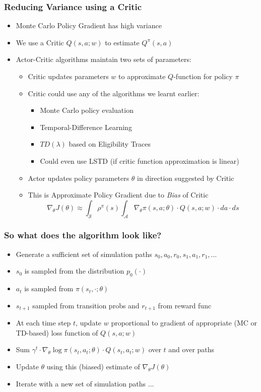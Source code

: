 \documentclass[handout]{beamer}
\begin{document}
\begin{frame}
\frametitle{Reducing Variance using a Critic}
\pause
\begin{itemize}[<+->]
\item Monte Carlo Policy Gradient has high variance
\item We use a Critic $Q(s,a; w)$ to estimate $Q^{\pi}(s,a)$
\item Actor-Critic algorithms maintain two sets of parameters:
\begin{itemize}
\item Critic updates parameters $w$ to approximate $Q$-function for policy $\pi$
\item Critic could use any of the algorithms we learnt earlier:
\begin{itemize}
\item Monte Carlo policy evaluation
\item Temporal-Difference Learning
\item $TD(\lambda)$ based on Eligibility Traces
\item Could even use LSTD (if critic function approximation is linear)
\end{itemize}
\item Actor updates policy parameters $\theta$ in direction suggested by Critic
\item This is Approximate Policy Gradient due to {\em Bias} of Critic
$$ \nabla_{\theta} J(\theta) \approx \int_{\mathcal{S}} \rho^{\pi}(s) \int_{\mathcal{A}} \nabla_{\theta} \pi(s, a; \theta) \cdot Q(s,a; w) \cdot da \cdot ds $$
\end{itemize}
\end{itemize}
\end{frame}

\begin{frame}
\frametitle{So what does the algorithm look like?}
\pause
\begin{itemize}[<+->]
\item Generate a sufficient set of simulation paths $s_0,a_0,r_0,s_1,a_1,r_1,\ldots$
\item $s_0$ is sampled from the distribution $p_0(\cdot)$
\item $a_t$ is sampled from $\pi(s_t,\cdot; \theta)$
\item $s_{t+1}$ sampled from transition probs and $r_{t+1}$ from reward func
\item At each time step $t$, update $w$ proportional to gradient of appropriate (MC or TD-based) loss function of $Q(s,a;w)$
\item Sum $\gamma^t \cdot \nabla_{\theta} \log \pi(s_t,a_t; \theta) \cdot Q(s_t,a_t; w)$ over $t$ and over paths
\item Update $\theta$ using this (biased) estimate of $\nabla_{\theta} J(\theta)$
\item Iterate with a new set of simulation paths ...
\end{itemize}
\end{frame}
\end{document}
